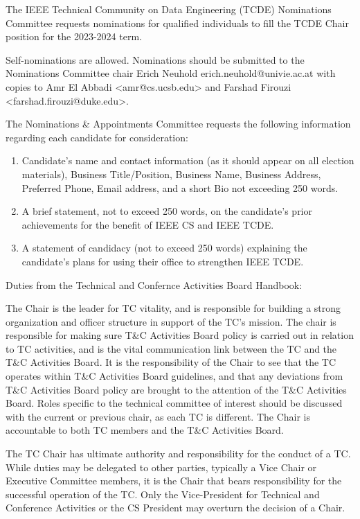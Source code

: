 
 

The IEEE Technical Community on Data Engineering (TCDE) Nominations Committee requests nominations for qualified individuals to fill the TCDE Chair position for the 2023-2024 term.

 

Self-nominations are allowed. Nominations should be submitted to the Nominations Committee chair Erich Neuhold erich.neuhold@univie.ac.at with copies to Amr El Abbadi <amr@cs.ucsb.edu> and Farshad Firouzi <farshad.firouzi@duke.edu>.

 

The Nominations \& Appointments Committee requests the following information regarding each candidate for consideration: 

\begin{enumerate}
\item Candidate's name and contact information (as it should appear on all election materials), Business Title/Position, Business Name, Business Address, Preferred Phone, Email address, and a short Bio not exceeding 250 words. 

\item A brief statement, not to exceed 250 words, on the candidate’s prior achievements for the benefit of IEEE CS and IEEE TCDE.  

\item A statement of candidacy (not to exceed 250 words) explaining the candidate’s plans for using their office to strengthen IEEE TCDE.
\end{enumerate}

 

Duties from the Technical and Confernce Activities Board Handbook:

     The Chair is the leader for TC vitality, and is responsible for building a strong organization and officer structure in support of the TC’s mission. The chair is responsible for making sure T\&C Activities Board policy is carried out in relation to TC activities, and is the vital communication link between the TC and the T\&C Activities Board. It is the responsibility of the Chair to see that the TC operates within T\&C Activities Board guidelines, and that any deviations from T\&C Activities Board policy are brought to the attention of the T\&C Activities Board. Roles specific to the technical committee of interest should be discussed with the current or previous chair, as each TC is different. The Chair is accountable to both TC members and the T\&C Activities Board.

    The TC Chair has ultimate authority and responsibility for the conduct of a TC. While duties may be delegated to other parties, typically a Vice Chair or Executive Committee members, it is the Chair that bears responsibility for the successful operation of the TC. Only the Vice-President for Technical and Conference Activities or the CS President may overturn the decision of a Chair.
